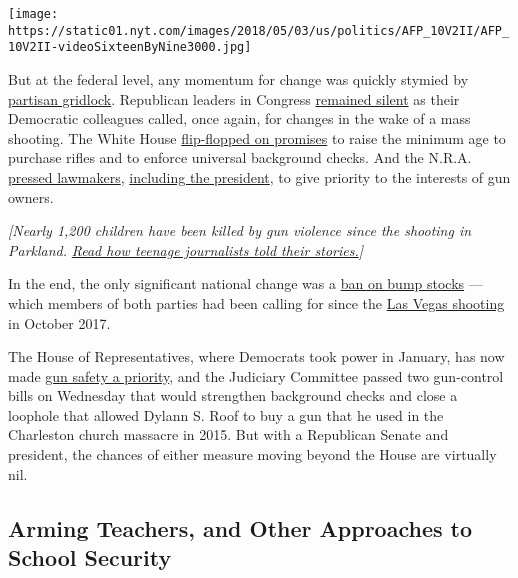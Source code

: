 \texttt{[image: https://static01.nyt.com/images/2018/05/03/us/politics/AFP\_10V2II/AFP\_10V2II-videoSixteenByNine3000.jpg]}

But at the federal level, any momentum for change was quickly stymied by
\href{https://www.nytimes.com/2018/02/15/us/politics/congress-inaction-guns.html}{partisan
gridlock}. Republican leaders in Congress
\href{https://www.nytimes.com/2018/02/25/us/politics/gun-control-congress-governors.html}{remained
silent} as their Democratic colleagues called, once again, for changes
in the wake of a mass shooting. The White House
\href{https://www.nytimes.com/2018/03/12/us/politics/trump-gun-control-national-rifle-association.html}{flip-flopped
on promises} to raise the minimum age to purchase rifles and to enforce
universal background checks. And the N.R.A.
\href{https://www.nytimes.com/2018/02/24/us/politics/nra-gun-control-florida.html}{pressed
lawmakers},
\href{https://www.nytimes.com/2018/03/01/us/politics/trump-republicans-gun-control.html}{including
the president}, to give priority to the interests of gun owners.

\emph{{[}Nearly 1,200 children have been killed by gun violence since
the shooting in Parkland.}
\href{https://www.nytimes.com/2019/02/13/us/parkland-obituaries-students.html}{\emph{Read
how teenage journalists told their stories.}}\emph{{]}}

In the end, the only significant national change was a
\href{https://www.nytimes.com/2018/12/18/us/politics/trump-bump-stocks-ban.html}{ban
on bump stocks} --- which members of both parties had been calling for
since the
\href{https://www.nytimes.com/interactive/2017/10/02/us/vegas-guns.html}{Las
Vegas shooting} in October 2017.

The House of Representatives, where Democrats took power in January, has
now made
\href{https://www.nytimes.com/2019/01/08/us/politics/house-democrats-gun-control.html}{gun
safety a priority}, and the Judiciary Committee passed two gun-control
bills on Wednesday that would strengthen background checks and close a
loophole that allowed Dylann S. Roof to buy a gun that he used in the
Charleston church massacre in 2015. But with a Republican Senate and
president, the chances of either measure moving beyond the House are
virtually nil.

\hypertarget{arming-teachers-and-other-approaches-to-school-security}{%
\subsection{Arming Teachers, and Other Approaches to School
Security}\label{arming-teachers-and-other-approaches-to-school-security}}

